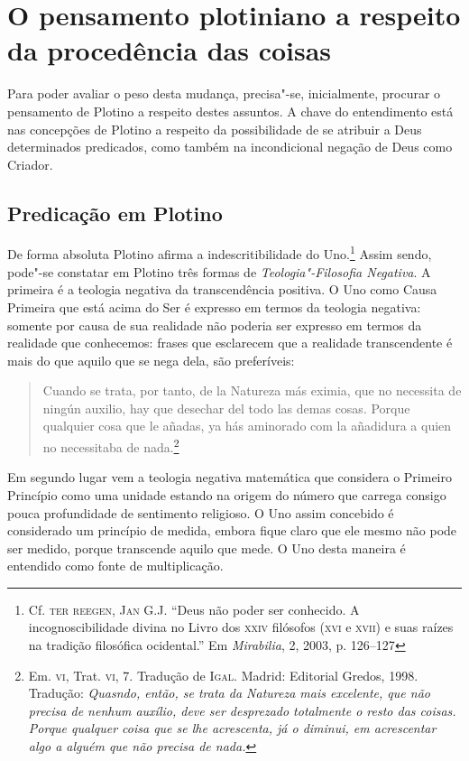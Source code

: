\section{O pensamento plotiniano a respeito da procedência das coisas}

 Para poder avaliar o peso desta mudança,
precisa"-se, inicialmente, procurar o pensamento de Plotino a
respeito destes assuntos. A chave do entendimento está nas
concepções de Plotino a respeito da possibilidade de se atribuir
a Deus determinados predicados, como também na incondicional
negação de Deus como Criador.

\subsection{Predicação em Plotino}

De forma absoluta Plotino afirma a indescritibilidade do
Uno.\footnote{ Cf. \textsc{ter reegen, Jan G.J.} ``Deus não poder
ser conhecido. A incognoscibilidade divina no Livro dos \textsc{xxiv}
filósofos (\textsc{xvi} e \textsc{xvii}) e suas raízes na tradição filosófica
ocidental.'' Em \emph{Mirabilia}, 2, 2003, p. 126--127} Assim
sendo, pode"-se constatar em Plotino três formas de
\emph{Teologia"-Filosofia Negativa}. A primeira é a teologia
negativa da transcendência positiva. O Uno como Causa Primeira
que está acima do Ser é expresso em termos da teologia negativa:
somente por causa de sua realidade não poderia ser expresso em
termos da realidade que conhecemos: frases que esclarecem que  a
realidade transcendente é mais do que aquilo que se nega dela,
são preferíveis:  

\begin{quote}
Cuando se trata, por tanto, de la Natureza más eximia, que no
necessita de ningún auxilio, hay que desechar del todo las demas
cosas. Porque qualquier cosa que le añadas, ya hás aminorado
com la añadidura a quien no necessitaba de nada.\footnote{ Em.
\textsc{vi}, Trat. \textsc{vi}, 7. Tradução de \textsc{Igal}.
Madrid: Editorial Gredos, 1998. Tradução: \emph{Quasndo, então,
se trata da Natureza mais excelente, que não precisa de nenhum
auxílio, deve ser desprezado totalmente o resto das coisas.
Porque qualquer coisa que se lhe acrescenta, já  o diminui, em
acrescentar algo a alguém que não precisa de nada.}} 
\end{quote}

Em segundo lugar vem a teologia negativa matemática que considera
o Primeiro Princípio como uma unidade estando na origem do
número que carrega consigo pouca profundidade de sentimento
religioso. O Uno assim concebido é considerado um princípio de
medida, embora fique claro que ele mesmo não pode ser medido,
porque transcende aquilo que mede. O Uno desta maneira é
entendido como fonte de multiplicação. 

